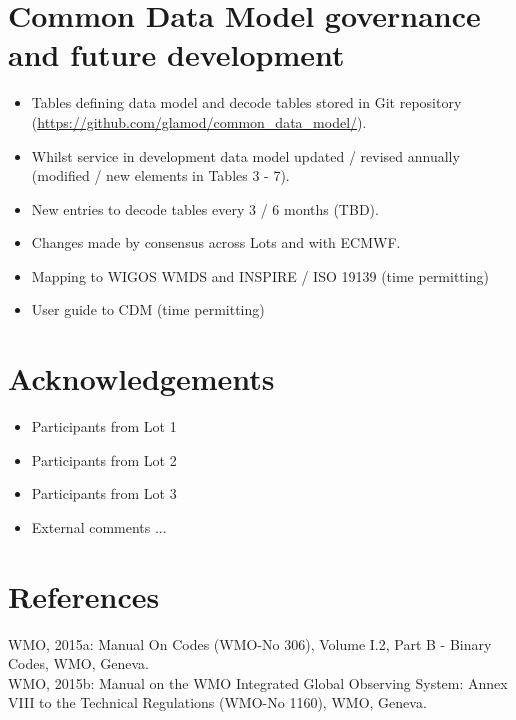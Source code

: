\documentclass[a4paper]{article}
\begin{document}
\section {Common Data Model governance and future development}
\begin{itemize}
\item Tables defining data model and decode tables stored in Git repository (\url{https://github.com/glamod/common_data_model/}).
\item Whilst service in development data model updated / revised annually (modified / new elements in Tables 3 - 7).
\item New entries to decode tables every 3 / 6 months (TBD).
\item Changes made by consensus across Lots and with ECMWF.
\item Mapping to WIGOS WMDS and INSPIRE / ISO 19139 (time permitting)
\item User guide to CDM (time permitting)
\end{itemize}

\section {Acknowledgements}
\begin{itemize}
\item Participants from Lot 1
\item Participants from Lot 2
\item Participants from Lot 3
\item External comments ...
\end{itemize}

\section {References}

\noindent WMO, 2015a: Manual On Codes (WMO-No 306), Volume I.2, Part B - Binary Codes, WMO, Geneva.\\
\noindent WMO, 2015b:  Manual on the WMO Integrated Global Observing System: Annex VIII to the Technical Regulations (WMO-No 1160), WMO, Geneva.
\end{document}
